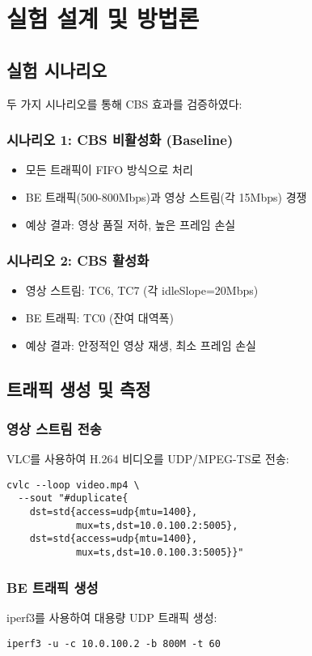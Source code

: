 \documentclass[10pt,twocolumn]{article}
\begin{document}
\section{실험 설계 및 방법론}

\subsection{실험 시나리오}
두 가지 시나리오를 통해 CBS 효과를 검증하였다:

\subsubsection{시나리오 1: CBS 비활성화 (Baseline)}
\begin{itemize}
\item 모든 트래픽이 FIFO 방식으로 처리
\item BE 트래픽(500-800Mbps)과 영상 스트림(각 15Mbps) 경쟁
\item 예상 결과: 영상 품질 저하, 높은 프레임 손실
\end{itemize}

\subsubsection{시나리오 2: CBS 활성화}
\begin{itemize}
\item 영상 스트림: TC6, TC7 (각 idleSlope=20Mbps)
\item BE 트래픽: TC0 (잔여 대역폭)
\item 예상 결과: 안정적인 영상 재생, 최소 프레임 손실
\end{itemize}

\subsection{트래픽 생성 및 측정}
\subsubsection{영상 스트림 전송}
VLC를 사용하여 H.264 비디오를 UDP/MPEG-TS로 전송:
\begin{verbatim}
cvlc --loop video.mp4 \
  --sout "#duplicate{
    dst=std{access=udp{mtu=1400},
            mux=ts,dst=10.0.100.2:5005},
    dst=std{access=udp{mtu=1400},
            mux=ts,dst=10.0.100.3:5005}}"
\end{verbatim}

\subsubsection{BE 트래픽 생성}
iperf3를 사용하여 대용량 UDP 트래픽 생성:
\begin{verbatim}
iperf3 -u -c 10.0.100.2 -b 800M -t 60
\end{verbatim}
\end{document}
